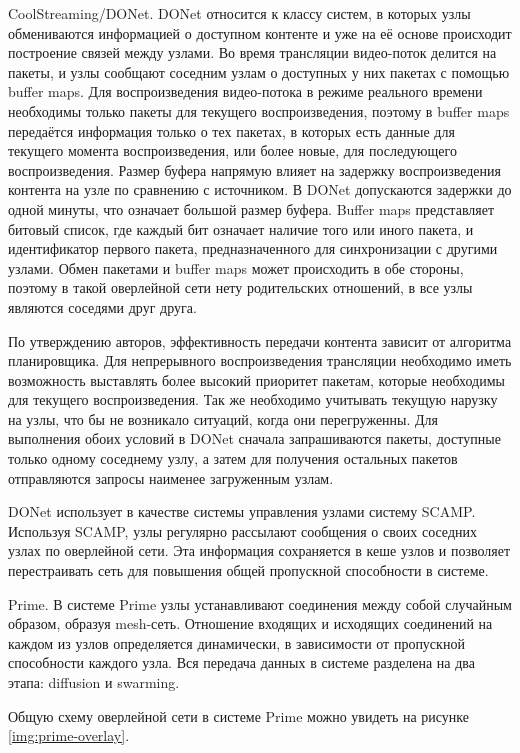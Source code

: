 		CoolStreaming/DONet. DONet относится к классу систем, в которых узлы обмениваются информацией о доступном контенте и уже на её основе
		происходит построение связей между узлами. Во время трансляции видео-поток делится на пакеты, и узлы сообщают
		соседним узлам о доступных у них пакетах с помощью buffer maps. Для воспроизведения видео-потока в
		режиме реального времени необходимы только пакеты для текущего воспроизведения, поэтому в buffer maps передаётся
		информация только о тех пакетах, в которых есть данные для текущего момента воспроизведения, или более новые,
		для последующего воспроизведения. Размер буфера напрямую влияет на задержку воспроизведения контента на узле по
		сравнению с источником. В DONet допускаются задержки до одной минуты, что означает большой размер буфера.
		Buffer maps представляет битовый список, где каждый бит означает наличие того или иного пакета, и идентификатор
		первого пакета, предназначенного для синхронизации с другими узлами. Обмен пакетами и buffer maps может
		происходить в обе стороны, поэтому в такой оверлейной сети нету родительских отношений, в все узлы являются
		соседями друг друга.

		По утверждению авторов, эффективность передачи контента зависит от алгоритма планировщика. Для непрерывного
		воспроизведения трансляции необходимо иметь возможность выставлять более высокий приоритет пакетам, которые
		необходимы для текущего воспроизведения. Так же необходимо учитывать текущую нарузку на узлы, что бы не
		возникало ситуаций, когда они перегруженны. Для выполнения обоих условий в DONet сначала запрашиваются пакеты,
		доступные только одному соседнему узлу, а затем для получения остальных пакетов отправляются запросы наименее
		загруженным узлам.

		DONet использует в качестве системы управления узлами систему SCAMP. Используя SCAMP, узлы регулярно рассылают
		сообщения о своих соседних узлах по оверлейной сети. Эта информация сохраняется в кеше узлов и позволяет
		перестраивать сеть для повышения общей пропускной способности в системе.

		Prime. В системе Prime \cite{4803721} узлы устанавливают соединения между собой случайным образом, образуя mesh-сеть. Отношение
		входящих и исходящих соединений на каждом из узлов определяется динамически, в зависимости от пропускной
		способности каждого узла. Вся передача данных в системе разделена на два этапа: diffusion и
		swarming.

		Общую схему оверлейной сети в системе Prime можно увидеть на рисунке \ref{img:prime-overlay}.

